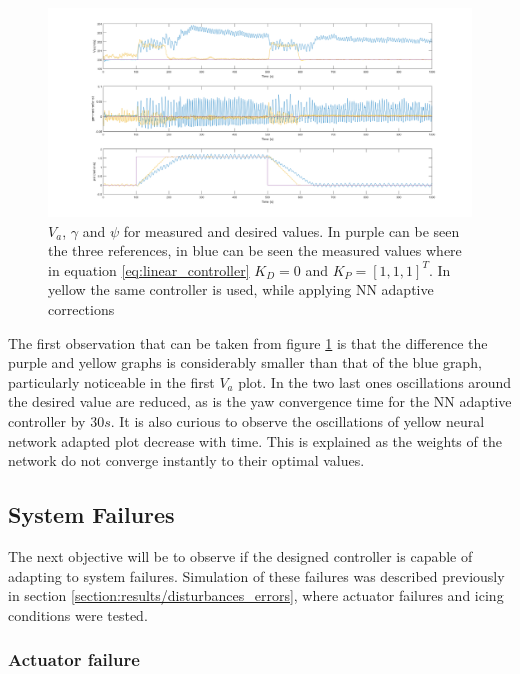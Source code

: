 \begin{figure}[H]
\centering
\includegraphics[width=1.1\textwidth]{Figures/Results/ref_bad_control.png}
\caption[Poorly tuned controller comparison]{$V_a$, $\gamma$ and $\psi$ for measured and desired values. In purple can be seen the three references, in blue can be seen the measured values where in equation \ref{eq:linear_controller} $K_D=0$ and $K_P = [1,1,1]^T$. In yellow the same controller is used, while applying NN adaptive corrections}
\label{fig:ref_bad_control}
\end{figure}

The first observation that can be taken from figure \ref{fig:ref_bad_control} is that the difference the purple and yellow graphs is considerably smaller than that of the blue graph, particularly noticeable in the first $V_a$ plot. In the two last ones oscillations around the desired value are reduced, as is the yaw convergence time for the NN adaptive controller by $30s$.
It is also curious to observe the oscillations of yellow neural network adapted plot decrease with time. This is explained as the weights of the network do not converge instantly to their optimal values.


\subsection{System Failures}

The next objective will be to observe if the designed controller is capable of adapting to system failures. Simulation of these failures was described previously in section \ref{section:results/disturbances_errors}, where actuator failures and icing conditions were tested. 

\subsubsection{Actuator failure}

